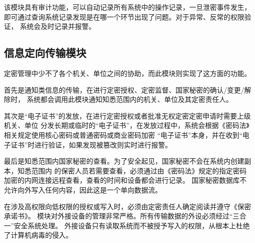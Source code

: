 该模块具有审计功能，可以自动记录所有系统中的操作记录，一旦泄密事件发生，
即可通过查询系统记录发现是在哪一个环节出现了问题。对于异常、反常的权限验证，
系统会及时记录并报警。

\subsection{信息定向传输模块}
定密管理中少不了各个机关、单位之间的协助，而此模块则实现了这方面的功能。

首先是通知类信息的传输，在进行定密授权、定密监督、国家秘密的确认/变更/解除时，
系统都会调用此模块通知知悉范围内的机关、单位及其定密责任人。

其次是“电子证书”的发放，在进行定密授权或者批准无权定密定密申请时需要上级机关、单位
分发长期或临时的“电子证书”，在发放过程中，系统会根据《密码法》相关规定使用核心密码或普通密码或商业密码加密
“电子证书”本身，并在收到“电子证书”时进行验证，如果发现被篡改则实时进行报警。

最后是知悉范围内国家秘密的查看。为了安全起见，国家秘密不会在系统内创建副本，知悉范围内
的保密人员若需要查看，必须通过由《密码法》规定的指定密码加密的内网连接远程查看，查看的时间和设备都会进行记录。
国家秘密数据库不允许向外写入任何内容，因此这是一个单向数据流。

在涉及高权限向低权限的授权或写入时，必须由定密责任人确定阅读并遵守《保密承诺书》\cite{jiyugongzuoliu}。
模块对外接设备的管理非常严格。所有传输数据的外设必须经过“三合一”安全系统处理。
外接设备只有读取系统而不被授予写入的权限，从根本上杜绝了计算机病毒的侵入。
